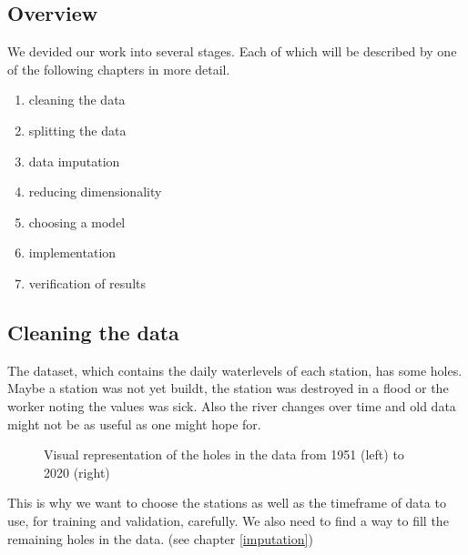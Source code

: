 \documentclass{article}
\newenvironment{enumeratenumeric}{\begin{enumerate}[1.] }{\end{enumerate}}
\begin{document}
\subsection{Overview}

We devided our work into several stages. Each of which will be described by
one of the following chapters in more detail.
\begin{enumeratenumeric}
  \item cleaning the data
  
  \item splitting the data
  
  \item data imputation
  
  \item reducing dimensionality
  
  \item choosing a model
  
  \item implementation
  
  \item verification of results
\end{enumeratenumeric}
\subsection{Cleaning the data}\label{clean}

The dataset, which contains the daily waterlevels of each station, has some
holes. Maybe a station was not yet buildt, the station was destroyed in a
flood or the worker noting the values was sick. Also the river changes over
time and old data might not be as useful as one might hope for.

\begin{figure}[h]
  \caption{Visual representation of the holes in the data from 1951 (left) to
  2020 (right)}
\end{figure}

This is why we want to choose the stations as well as the timeframe of data to
use, for training and validation, carefully. We also need to find a way to
fill the remaining holes in the data. (see chapter \ref{imputation})
\end{document}
